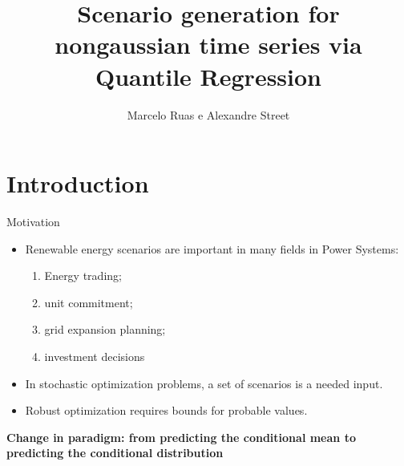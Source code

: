 \documentclass[11pt]{beamer}
\begin{document}
\author{Marcelo Ruas e Alexandre Street}
\title{Scenario generation for nongaussian time series via Quantile Regression}
\begin{frame}[plain]
\maketitle
\end{frame}






\section{Introduction}\label{introduction}


\begin{frame}{Motivation}

	\begin{itemize}
		\item
		Renewable energy scenarios are important in many fields in Power
		Systems:
		
		\begin{enumerate}
			\def\labelenumi{\roman{enumi})}
			
			\item
			Energy trading;
			\item
			unit commitment;
			\item
			grid expansion planning;
			\item
			investment decisions
		\end{enumerate}
		\item
		In stochastic optimization problems, a set of scenarios is a needed
		input.
		\item
		Robust optimization requires bounds for probable values.
	\end{itemize}

	\textbf{Change in paradigm: from predicting the conditional mean to
		predicting the conditional distribution}

\end{frame}
\end{document}
